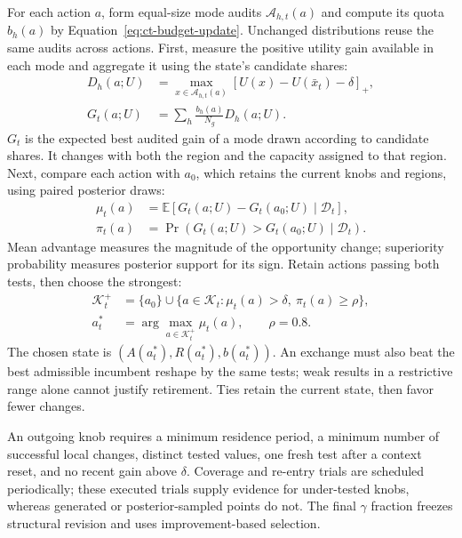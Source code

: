 \documentclass[runningheads]{llncs}
\begin{document}
For each action $a$, form equal-size mode audits
$\mathcal A_{h,t}(a)$ and compute its quota $b_h(a)$ by
Equation~\ref{eq:ct-budget-update}. Unchanged distributions reuse the same
audits across actions. First, measure the positive utility gain available
in each mode and aggregate it using the state's candidate shares:
\begin{equation}
\begin{aligned}
 D_h(a;U)&=\max_{x\in\mathcal A_{h,t}(a)}[U(x)-U(\bar x_t)-\delta]_+,\\
 G_t(a;U)&=\sum_h\frac{b_h(a)}{N_g}D_h(a;U).
\end{aligned}
\label{eq:ct-state-opportunity}
\end{equation}
$G_t$ is the expected best audited gain of a mode drawn according to
candidate shares. It changes with both the region and the capacity assigned
to that region. Next, compare each action with $a_0$, which retains the
current knobs and regions, using paired posterior draws:
\begin{equation}
\begin{aligned}
 \mu_t(a)&=\mathbb E[G_t(a;U)-G_t(a_0;U)\mid\mathcal D_t],\\
 \pi_t(a)&=\Pr(G_t(a;U)>G_t(a_0;U)\mid\mathcal D_t).
\end{aligned}
\label{eq:ct-action-advantage}
\end{equation}
Mean advantage measures the magnitude of the opportunity change;
superiority probability measures posterior support for its sign.
Retain actions passing both tests, then choose the strongest:
\begin{equation}
\begin{aligned}
 \mathcal K_t^+&=\{a_0\}\cup\{a\in\mathcal K_t:\mu_t(a)>\delta,\ \pi_t(a)\geq\rho\},\\
 a_t^*&=\arg\max_{a\in\mathcal K_t^+}\mu_t(a),\qquad\rho=0.8.
\end{aligned}
\label{eq:ct-joint-action}
\end{equation}
The chosen state is $(A(a_t^*),R(a_t^*),b(a_t^*))$. An exchange must also
beat the best admissible incumbent reshape by the same tests; weak results
in a restrictive range alone cannot justify retirement. Ties retain the
current state, then favor fewer changes.

An outgoing knob requires a minimum residence period, a minimum number of
successful local changes, distinct tested values, one fresh test after a
context reset, and no recent gain above $\delta$. Coverage and re-entry
trials are scheduled periodically; these executed trials supply evidence
for under-tested knobs, whereas generated or posterior-sampled points do
not. The final $\gamma$ fraction freezes structural revision and uses
improvement-based selection.
\end{document}
